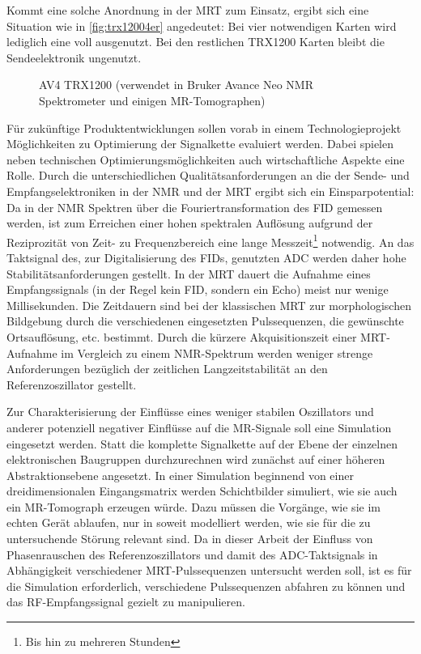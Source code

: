 Kommt eine solche Anordnung in der MRT zum Einsatz, ergibt sich eine Situation wie in \autoref{fig:trx12004er} angedeutet: Bei vier notwendigen Karten wird lediglich eine voll ausgenutzt. Bei den restlichen TRX1200 Karten bleibt die Sendeelektronik ungenutzt.

\begin{figure}[H]
	\centering
	\caption[Bruker Avance Neo TRX1200 Karte]{AV4 TRX1200 (verwendet in Bruker Avance Neo NMR Spektrometer und einigen MR-Tomographen)}
	\label{fig:trx12004er}
\end{figure}

Für zukünftige Produktentwicklungen sollen vorab in einem Technologieprojekt Möglichkeiten zu Optimierung der Signalkette evaluiert werden. Dabei spielen neben technischen Optimierungsmöglichkeiten auch wirtschaftliche Aspekte eine Rolle.
Durch die unterschiedlichen Qualitätsanforderungen an die der Sende- und Empfangselektroniken in der NMR und der MRT ergibt sich ein Einsparpotential: Da in der NMR Spektren über die Fouriertransformation des FID gemessen werden, ist zum Erreichen einer hohen spektralen Auflösung aufgrund der Reziprozität von Zeit- zu Frequenzbereich eine lange Messzeit\footnote{Bis hin zu mehreren Stunden} notwendig. An das Taktsignal des, zur Digitalisierung des FIDs, genutzten ADC werden daher hohe Stabilitätsanforderungen gestellt. In der MRT dauert die Aufnahme eines Empfangssignals (in der Regel kein FID, sondern ein Echo) meist nur wenige Millisekunden. Die Zeitdauern sind bei der klassischen MRT zur morphologischen Bildgebung durch die verschiedenen eingesetzten Pulssequenzen, die gewünschte Ortsauflösung, etc. bestimmt.
Durch die kürzere Akquisitionszeit einer MRT-Aufnahme im Vergleich zu einem NMR-Spektrum werden weniger strenge Anforderungen bezüglich der zeitlichen Langzeitstabilität an den Referenzoszillator gestellt.

Zur Charakterisierung der Einflüsse eines weniger stabilen Oszillators und anderer potenziell negativer Einflüsse auf die MR-Signale soll eine Simulation eingesetzt werden. Statt die komplette Signalkette auf der Ebene der einzelnen elektronischen Baugruppen durchzurechnen wird zunächst auf einer höheren Abstraktionsebene angesetzt. In einer Simulation beginnend von einer dreidimensionalen Eingangsmatrix werden Schichtbilder simuliert, wie sie auch ein MR-Tomograph erzeugen würde. Dazu müssen die Vorgänge, wie sie im echten Gerät ablaufen, nur in soweit modelliert werden, wie sie für die zu untersuchende Störung relevant sind. Da in dieser Arbeit der Einfluss von Phasenrauschen des Referenzoszillators und damit des ADC-Taktsignals in Abhängigkeit verschiedener MRT-Pulssequenzen untersucht werden soll, ist es für die Simulation erforderlich, verschiedene Pulssequenzen abfahren zu können und das RF-Empfangssignal gezielt zu manipulieren.

